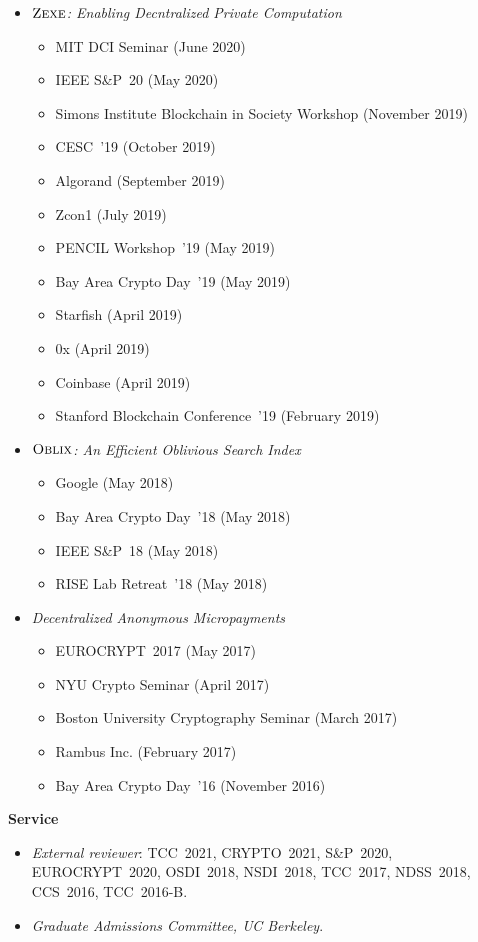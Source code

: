 \documentclass[11pt]{article}
\begin{document}
\begin{cv}{\vspace{-5em}}
\begin{itemize}
    \item[] \emph{$\textsc{Zexe}$: Enabling Decntralized Private Computation}
    \begin{itemize}[noitemsep]
      \item[] MIT DCI Seminar (June 2020)
      \item[] IEEE S\&P~20 (May 2020)
      \item[] Simons Institute Blockchain in Society Workshop (November 2019)
      \item[] CESC~'19 (October 2019)
      \item[] Algorand (September 2019)
      \item[] Zcon1 (July 2019)
      \item[] PENCIL Workshop~'19 (May 2019)
      \item[] Bay Area Crypto Day~'19 (May 2019)
      \item[] Starfish (April 2019)
      \item[] 0x (April 2019)
      \item[] Coinbase (April 2019)
      \item[] Stanford Blockchain Conference~'19 (February 2019)
    \end{itemize}

    \item[] \emph{$\textsc{Oblix}$: An Efficient Oblivious Search Index}
    \begin{itemize}[noitemsep]
      \item[] Google (May 2018)
      \item[] Bay Area Crypto Day~'18 (May 2018)
      \item[] IEEE S\&P~18 (May 2018)
      \item[] RISE Lab Retreat~'18 (May 2018)
    \end{itemize}

    \item[] \emph{Decentralized Anonymous Micropayments} 
    \begin{itemize}[noitemsep]
      \item[] EUROCRYPT~2017 (May 2017)
      \item[] NYU Crypto Seminar (April 2017)
      \item[] Boston University Cryptography Seminar (March 2017)
      \item[] Rambus Inc. (February 2017)
      \item[] Bay Area Crypto Day~'16 (November 2016)
    \end{itemize}
  \end{itemize}

  {\large \textbf{Service}}
  \begin{itemize}
    \small
    \item[] \emph{External reviewer}:
      TCC~2021,
      CRYPTO~2021,
      S\&P~2020,
      EUROCRYPT~2020,
      OSDI~2018,
      NSDI~2018,
      TCC~2017,
      NDSS~2018,
      CCS~2016,
      TCC~2016-B.

    \item[] \emph{Graduate Admissions Committee, UC Berkeley}.
  \end{itemize}
\end{cv}
\end{document}
